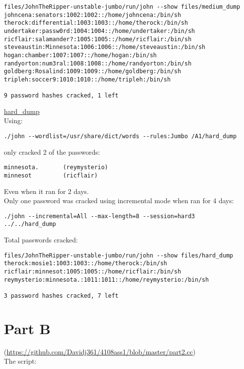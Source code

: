 \documentclass[12pt]{article}
\begin{document}
\begin{verbatim}
files/JohnTheRipper-unstable-jumbo/run/john --show files/medium_dump
johncena:senators:1002:1002::/home/johncena:/bin/sh
therock:differential:1003:1003::/home/therock:/bin/sh
undertaker:passw0rd:1004:1004::/home/undertaker:/bin/sh
ricflair:salamander?:1005:1005::/home/ricflair:/bin/sh
steveaustin:Minnesota:1006:1006::/home/steveaustin:/bin/sh
hogan:chamber:1007:1007::/home/hogan:/bin/sh
randyorton:num3ral:1008:1008::/home/randyorton:/bin/sh
goldberg:Rosalind:1009:1009::/home/goldberg:/bin/sh
tripleh:soccer9:1010:1010::/home/tripleh:/bin/sh

9 password hashes cracked, 1 left
\end{verbatim}

\underline{hard\_dump} \\

Using:
\begin{verbatim}
./john --wordlist=/usr/share/dict/words --rules:Jumbo /A1/hard_dump
\end{verbatim}
only cracked 2 of the passwords:
\begin{verbatim}
minnesota.       (reymysterio)
minnesot         (ricflair)
\end{verbatim}
Even when it ran for 2 days. \\

Only one password was cracked using incremental mode when ran for 4 days:
\begin{verbatim}
./john --incremental=All --max-length=8 --session=hard3 ../../hard_dump
\end{verbatim}

Total passwords cracked:
\begin{verbatim}
files/JohnTheRipper-unstable-jumbo/run/john --show files/hard_dump
therock:mosie1:1003:1003::/home/therock:/bin/sh
ricflair:minnesot:1005:1005::/home/ricflair:/bin/sh
reymysterio:minnesota.:1011:1011::/home/reymysterio:/bin/sh

3 password hashes cracked, 7 left
\end{verbatim}


\part*{Part B}

(\url{https://github.com/Davidj361/4108ass1/blob/master/part2.cc}) \\
The script: 
\end{document}

